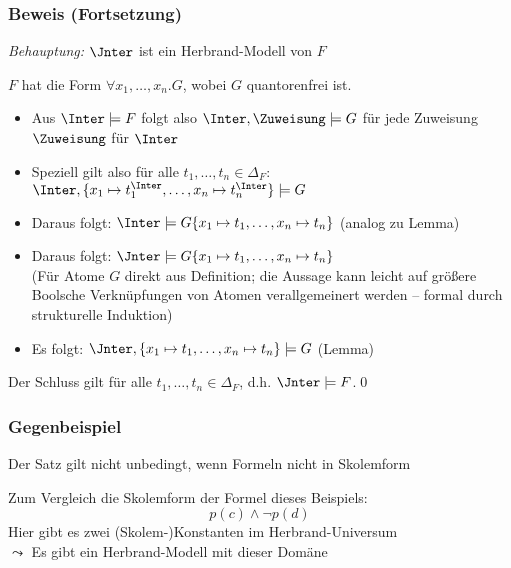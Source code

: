 \documentclass[aspectratio=1610,onlymath]{beamer}
\begin{document}
\begin{frame}\frametitle{Beweis (Fortsetzung)}

\emph{Behauptung:} \alert{$\Jnter$ ist ein Herbrand-Modell von $F$}\bigskip

$F$ hat die Form $\forall x_1,\ldots, x_n.G$, wobei $G$ quantorenfrei ist.\pause
\begin{itemize}
\item Aus $\Inter\models F$ folgt also $\Inter,\Zuweisung\models G$ für jede Zuweisung $\Zuweisung$ für $\Inter$\pause
\item Speziell gilt also für alle $t_1,\ldots,t_n\in\Delta_F$: $\Inter,\{x_1\mapsto t_1^{\Inter},\ldots,x_n\mapsto t_n^{\Inter}\}\models G$\pause
\item Daraus folgt: $\Inter\models G\{x_1\mapsto t_1,\ldots,x_n\mapsto t_n\}$  (analog zu Lemma)\pause
\item Daraus folgt: $\Jnter\models G\{x_1\mapsto t_1,\ldots,x_n\mapsto t_n\}$\\
{\footnotesize(Für Atome $G$ direkt aus Definition; die Aussage kann leicht auf größere Boolsche Verknüpfungen von Atomen verallgemeinert werden -- formal durch strukturelle Induktion)}\pause
\item Es folgt: $\Jnter,\{x_1\mapsto t_1,\ldots,x_n\mapsto t_n\}\models G$ (Lemma)
\end{itemize}
Der Schluss gilt für alle $t_1,\ldots,t_n\in\Delta_F$, d.h. $\Jnter\models F$.\qed

\end{frame}

\begin{frame}\frametitle{Gegenbeispiel}

Der Satz gilt nicht unbedingt, wenn Formeln nicht in Skolemform \bigskip


Zum Vergleich die Skolemform der Formel dieses Beispiels:
\[ p(c)\wedge\neg p(d)\]
Hier gibt es zwei (Skolem-)Konstanten im Herbrand-Universum\\
$\leadsto$ Es gibt ein Herbrand-Modell mit dieser Domäne

\end{frame}
\end{document}
